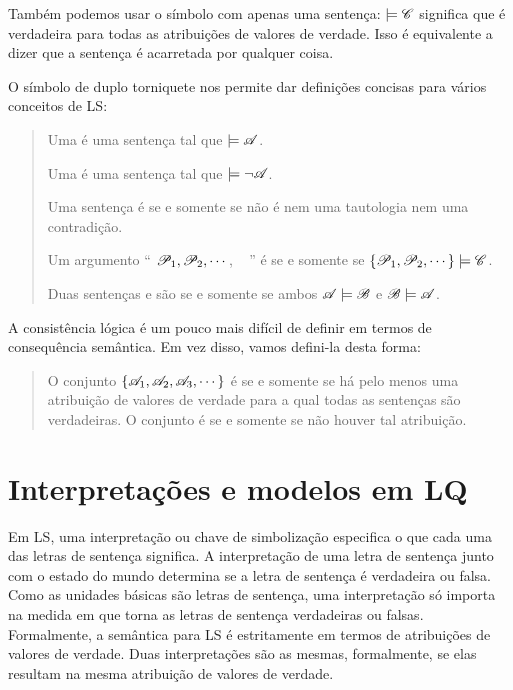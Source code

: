 Também podemos usar o símbolo com apenas uma sentença: $\models\mathscr{C}$ significa que  é verdadeira para todas as atribuições de valores de verdade. Isso é equivalente a dizer que a sentença é acarretada por qualquer coisa.

O símbolo de duplo torniquete nos permite dar definições concisas para vários conceitos de LS:
\begin{quote}
Uma  é uma sentença   tal que $\models\mathscr{A}$.

Uma  é uma sentença  tal que $\models\neg\mathscr{A}$.

Uma sentença é  se e somente se não é nem uma tautologia nem uma contradição.

Um argumento `` $\mathscr{P}_1, \mathscr{P}_2, \cdots$, \therefore\  '' é  se e somente se $\{\mathscr{P}_1,\mathscr{P}_2,\cdots\}\models\mathscr{C}$.

Duas sentenças  e  são  se e somente se ambos $\mathscr{A}\models\mathscr{B}$ e $\mathscr{B}\models\mathscr{A}$.
\end{quote}

A consistência lógica é um pouco mais difícil de definir em termos de consequência semântica. Em vez disso, vamos defini-la desta forma:

\begin{quote}
\label{def.consistencySL}
O conjunto $\{\mathscr{A}_1,\mathscr{A}_2,\mathscr{A}_3,\cdots\}$ é  se e somente se há pelo menos uma atribuição de valores de verdade para a qual todas as sentenças são verdadeiras. O conjunto é  se e somente se não houver tal atribuição.
\end{quote}

\section{Interpretações e modelos em LQ}

Em LS, uma interpretação ou chave de simbolização especifica o que cada uma das letras de sentença significa. A interpretação de uma letra de sentença junto com o estado do mundo determina se a letra de sentença é verdadeira ou falsa.
Como as unidades básicas são letras de sentença, uma interpretação só importa na medida em que torna as letras de sentença verdadeiras ou falsas. Formalmente, a semântica para LS é estritamente em termos de atribuições de valores de verdade. Duas interpretações são as mesmas, formalmente, se elas resultam na mesma atribuição de valores de verdade.

